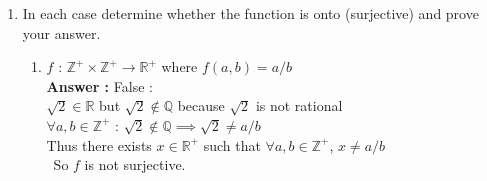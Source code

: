 \documentclass[a4paper,10pt]{article}
\def\lf{\left\lfloor}
\def\rf{\right\rfloor}
\newcommand{\answer}{\textbf{Answer : }}
\begin{document}
\begin{enumerate}
\begin{enumerate}
    \item $f : \mathbb{N} \to \mathbb{R} \text{ where } f(n) = \frac{1}{n}$ \\
    \answer True, $f$ is one-to-one. I will try to show this by contradiction. \\
    Assume that $n,m \in \mathbb{N}$, $n \neq m$ but $f(n) = f(m)$. \\
    $1/n = 1/m$ \\
    $m/n = 1$ \\
    $m = n$, but this contadicts the fact that $m \neq n$, thus our assumption that $f(n) = f(m)$ must be false \\ 

    \item $f : \mathbb{R} \to \mathbb{Z} \text{ where } f(x) = \lf x \rf$\\
    \answer No this is not one-to-one. A simple counter example would be \\
    $x = 0.1, y = 0.11$, $\lf x \rf = 0$, $ \lf y \rf = 0$, $\lf x \rf = \lf y \rf$ \\
    Thus two different inputs map to the same output, and $f$ is not one-to-one.

    \end{enumerate}

\item In each case determine whether the function is onto (surjective) and prove your answer.
    \begin{enumerate}
    \item $f$ : $\mathbb{Z}^+ \times \mathbb{Z}^+ \to \mathbb{R}^+$ where $f(a, b) = a/b$ \\
    \answer False : \\
    $\sqrt{2} \in \mathbb{R}$ but $\sqrt{2} \not \in \mathbb{Q}$ because $\sqrt{2}$ is not rational \\
    $\forall a,b \in \mathbb{Z}^+$ : $\sqrt{2} \not \in \mathbb{Q} \implies \sqrt{2} \neq a/b $ \\
    Thus there exists $x \in \mathbb{R}^+$ such that $\forall a,b \in \mathbb{Z}^+$, $x \neq a/b$ \\\
    So $f$ is not surjective. \\


\end{enumerate}
\end{enumerate}
\end{document}
